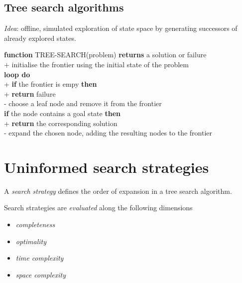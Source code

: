 \documentclass{article}
\begin{document}
\subsection{Tree search algorithms}

\emph{Idea}: offline, simulated exploration of state space by generating successors of already
explored states.

\begin{pseudo}
\textbf{function} TREE-SEARCH(problem) \textbf{returns} a solution or failure   \\+
    initialise the frontier using the initial state of the problem              \\
    \textbf{loop do}                                                            \\+
        \textbf{if} the frontier is empy \textbf{then}                          \\+
            \textbf{return} failure                                             \\-
        choose a leaf node and remove it from the frontier                      \\
        \textbf{if} the node contains a goal state \textbf{then}                \\+
            \textbf{return} the corresponding solution                          \\-
        expand the chosen node, adding the resulting nodes to the frontier
\end{pseudo}


\section{Uninformed search strategies}


\begin{definition}
    A \emph{search strategy} defines the order of expansion in a tree search algorithm.
\end{definition}

\begin{definition}
    Search strategies are \emph{evaluated} along the following
    dimensions
    \begin{itemize}
        \item \emph{completeness}
        \item \emph{optimality}
        \item \emph{time complexity}
        \item \emph{space complexity}
    \end{itemize}
\end{definition}
\end{document}
